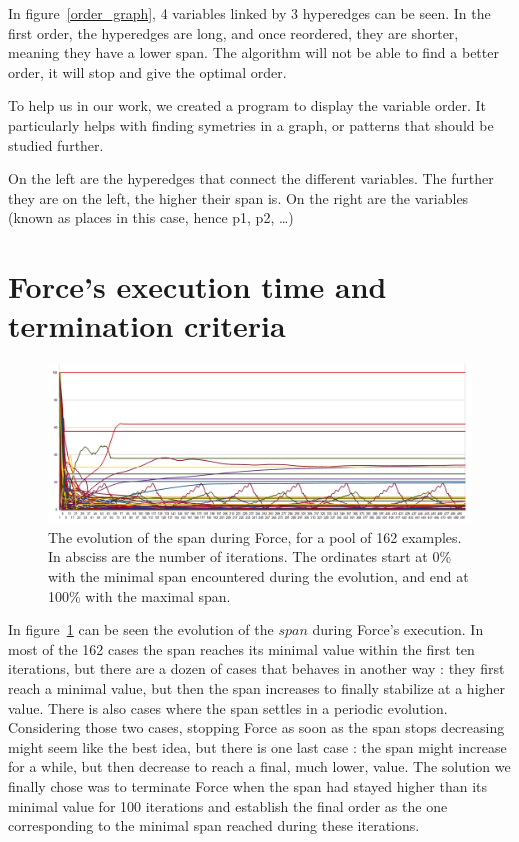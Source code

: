 \documentclass[12pt]{report}
\begin{document}
In figure~\ref{order_graph}, 4 variables linked by 3 hyperedges can be seen. In the first order, the hyperedges are long, and once reordered, they are shorter, meaning they have a lower span. The algorithm will not be able to find a better order, it will stop and give the optimal order.

To help us in our work, we created a program to display the variable order. It particularly helps with finding symetries in a graph, or patterns that should be studied further.

On the left are the hyperedges that connect the different variables. The further they are on the left, the higher their span is. On the right are the variables (known as places in this case, hence p1, p2, \ldots)


\section{Force's execution time and termination criteria}

\begin{figure}[H]
  \begin{center}
  \includegraphics[width=1\textwidth]{images/force_plot.png}
  \end{center}
  \caption{The evolution of the span during Force, for a pool of 162 examples. In absciss are the number of iterations. The ordinates start at 0\% with the minimal span encountered during the evolution, and end at 100\% with the maximal span.}
  \label{force_plot}
\end{figure}

In figure~\ref{force_plot} can be seen the evolution of the $span$ during Force's execution. In most of the 162 cases the span reaches its minimal value within the first ten iterations, but there are a dozen of cases that behaves in another way : they first reach a minimal value, but then the span increases to finally stabilize at a higher value. There is also cases where the span settles in a periodic evolution. Considering those two cases, stopping Force as soon as the span stops decreasing might seem like the best idea, but there is one last case : the span might increase for a while, but then decrease to reach a final, much lower, value.
The solution we finally chose was to terminate Force when the span had stayed higher than its minimal value for 100 iterations and establish the final order as the one corresponding to the minimal span reached during these iterations.
\end{document}
